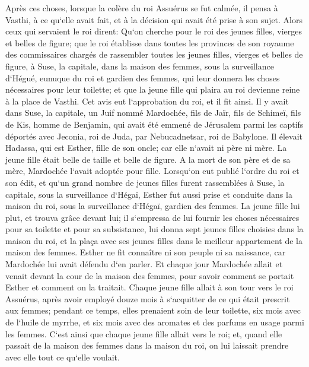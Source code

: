 \verse Après ces choses, lorsque la colère du roi Assuérus se fut calmée, il pensa à Vasthi, à ce qu`elle avait fait, et à la décision qui avait été prise à son sujet. 
\verse Alors ceux qui servaient le roi dirent: Qu`on cherche pour le roi des jeunes filles, vierges et belles de figure; 
\verse que le roi établisse dans toutes les provinces de son royaume des commissaires chargés de rassembler toutes les jeunes filles, vierges et belles de figure, à Suse, la capitale, dans la maison des femmes, sous la surveillance d`Hégué, eunuque du roi et gardien des femmes, qui leur donnera les choses nécessaires pour leur toilette; 
\verse et que la jeune fille qui plaira au roi devienne reine à la place de Vasthi. Cet avis eut l`approbation du roi, et il fit ainsi. 
\verse Il y avait dans Suse, la capitale, un Juif nommé Mardochée, fils de Jaïr, fils de Schimeï, fils de Kis, homme de Benjamin, 
\verse qui avait été emmené de Jérusalem parmi les captifs déportés avec Jeconia, roi de Juda, par Nebucadnetsar, roi de Babylone. 
\verse Il élevait Hadassa, qui est Esther, fille de son oncle; car elle n`avait ni père ni mère. La jeune fille était belle de taille et belle de figure. A la mort de son père et de sa mère, Mardochée l`avait adoptée pour fille. 
\verse Lorsqu`on eut publié l`ordre du roi et son édit, et qu`un grand nombre de jeunes filles furent rassemblées à Suse, la capitale, sous la surveillance d`Hégaï, Esther fut aussi prise et conduite dans la maison du roi, sous la surveillance d`Hégaï, gardien des femmes. 
\verse La jeune fille lui plut, et trouva grâce devant lui; il s`empressa de lui fournir les choses nécessaires pour sa toilette et pour sa subsistance, lui donna sept jeunes filles choisies dans la maison du roi, et la plaça avec ses jeunes filles dans le meilleur appartement de la maison des femmes. 
\verse Esther ne fit connaître ni son peuple ni sa naissance, car Mardochée lui avait défendu d`en parler. 
\verse Et chaque jour Mardochée allait et venait devant la cour de la maison des femmes, pour savoir comment se portait Esther et comment on la traitait. 
\verse Chaque jeune fille allait à son tour vers le roi Assuérus, après avoir employé douze mois à s`acquitter de ce qui était prescrit aux femmes; pendant ce temps, elles prenaient soin de leur toilette, six mois avec de l`huile de myrrhe, et six mois avec des aromates et des parfums en usage parmi les femmes. 
\verse C`est ainsi que chaque jeune fille allait vers le roi; et, quand elle passait de la maison des femmes dans la maison du roi, on lui laissait prendre avec elle tout ce qu`elle voulait. 
